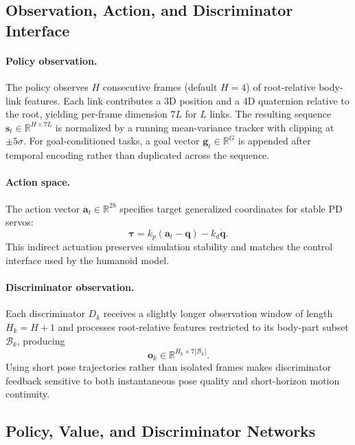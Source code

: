 \subsection{Observation, Action, and Discriminator Interface}
\label{sec:obs_action}

\paragraph{Policy observation.}
The policy observes $H$ consecutive frames (default $H=4$) of root-relative body-link features. Each link contributes a 3D position and a 4D quaternion relative to the root, yielding per-frame dimension $7L$ for $L$ links. The resulting sequence $\mathbf{s}_t \in \mathbb{R}^{H \times 7L}$ is normalized by a running mean-variance tracker with clipping at $\pm 5\sigma$. For goal-conditioned tasks, a goal vector $\mathbf{g}_t \in \mathbb{R}^{G}$ is appended after temporal encoding rather than duplicated across the sequence.

\paragraph{Action space.}
The action vector $\mathbf{a}_t \in \mathbb{R}^{28}$ specifies target generalized coordinates for stable PD servos:
\[
    \boldsymbol{\tau} = k_p(\mathbf{a}_t - \mathbf{q}) - k_d\dot{\mathbf{q}}.
\]
This indirect actuation preserves simulation stability and matches the control interface used by the humanoid model.

\paragraph{Discriminator observation.}
Each discriminator $D_k$ receives a slightly longer observation window of length $H_k = H+1$ and processes root-relative features restricted to its body-part subset $\mathcal{B}_k$, producing
\[
    \mathbf{o}_k \in \mathbb{R}^{H_k \times 7|\mathcal{B}_k|}.
\]
Using short pose trajectories rather than isolated frames makes discriminator feedback sensitive to both instantaneous pose quality and short-horizon motion continuity.

\subsection{Policy, Value, and Discriminator Networks}
\label{sec:policy_arch}

